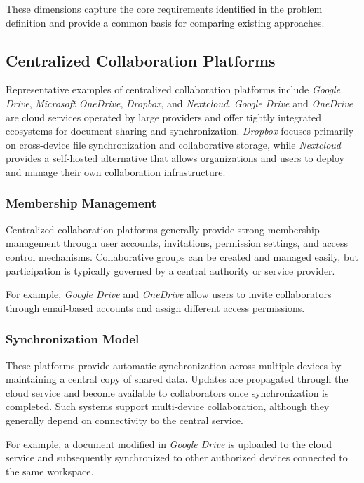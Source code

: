 These dimensions capture the core requirements identified in
the problem definition and provide a common basis for comparing
existing approaches.


\subsection{Centralized Collaboration Platforms}

Representative examples of centralized collaboration platforms
include \textit{Google Drive}, \textit{Microsoft OneDrive},
\textit{Dropbox}, and \textit{Nextcloud}. \textit{Google Drive}
and \textit{OneDrive} are cloud services operated by large
providers and offer tightly integrated ecosystems for document
sharing and synchronization. \textit{Dropbox} focuses primarily
on cross-device file synchronization and collaborative
storage, while \textit{Nextcloud} provides a self-hosted
alternative that allows organizations and users to deploy and
manage their own collaboration infrastructure.

\subsubsection{Membership Management}
Centralized collaboration platforms generally provide strong
membership management through user accounts, invitations,
permission settings, and access control mechanisms.
Collaborative groups can be created and managed easily, but
participation is typically governed by a central authority or
service provider.

For example, \textit{Google Drive} and \textit{OneDrive}
allow users to invite collaborators through email-based
accounts and assign different access permissions.

\subsubsection{Synchronization Model}
These platforms provide automatic synchronization across
multiple devices by maintaining a central copy of shared data.
Updates are propagated through the cloud service and become
available to collaborators once synchronization is completed.
Such systems support multi-device collaboration, although they
generally depend on connectivity to the central service.

For example, a document modified in \textit{Google Drive}
is uploaded to the cloud service and subsequently synchronized
to other authorized devices connected to the same workspace.

